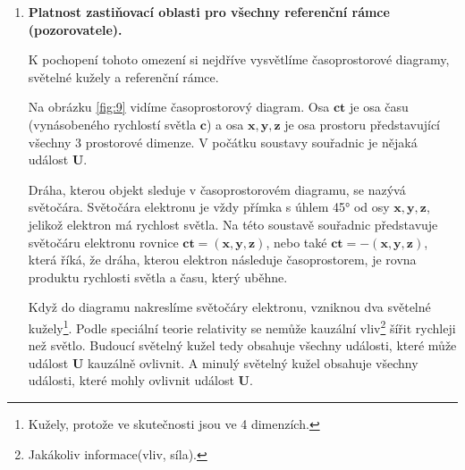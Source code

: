 \begin{enumerate}
    \item \textbf{Platnost zastiňovací oblasti pro všechny referenční rámce (pozorovatele).}

    K pochopení tohoto omezení si nejdříve vysvětlíme časoprostorové diagramy, světelné kužely a referenční rámce.

    Na obrázku \ref{fig:9} vidíme časoprostorový diagram. Osa $\bm{ct}$ je osa času (vynásobeného rychlostí světla $\bm{c}$) a osa $\bm{x,y,z}$ je osa prostoru představující všechny 3 prostorové dimenze. V počátku soustavy souřadnic je nějaká událost $\bm{U}$. 
    
    Dráha, kterou objekt sleduje v časoprostorovém diagramu, se nazývá světočára. Světočára elektronu je vždy přímka s úhlem 45° od osy $\bm{x,y,z}$, jelikož elektron má rychlost světla. Na této soustavě souřadnic představuje světočáru elektronu rovnice $\bm{ct=(x,y,z)}$, nebo také $\bm{ct=-(x,y,z)}$, která říká, že dráha, kterou elektron následuje časoprostorem, je rovna produktu rychlosti světla a času, který uběhne.

    Když do diagramu nakreslíme světočáry elektronu, vzniknou dva světelné kužely\footnote[7]{Kužely, protože ve skutečnosti jsou ve 4 dimenzích.}. Podle speciální teorie relativity\parencite{SpRel} se nemůže kauzální vliv\footnote[8]{Jakákoliv informace(vliv, síla).} šířit rychleji než světlo. Budoucí světelný kužel tedy obsahuje všechny události, které může událost $\bm{U}$ kauzálně ovlivnit. A minulý světelný kužel obsahuje všechny události, které mohly ovlivnit událost $\bm{U}$.

    \clearpage

    \begin{figure}[ht]

        \centering
    
\end{figure}
\end{enumerate}
